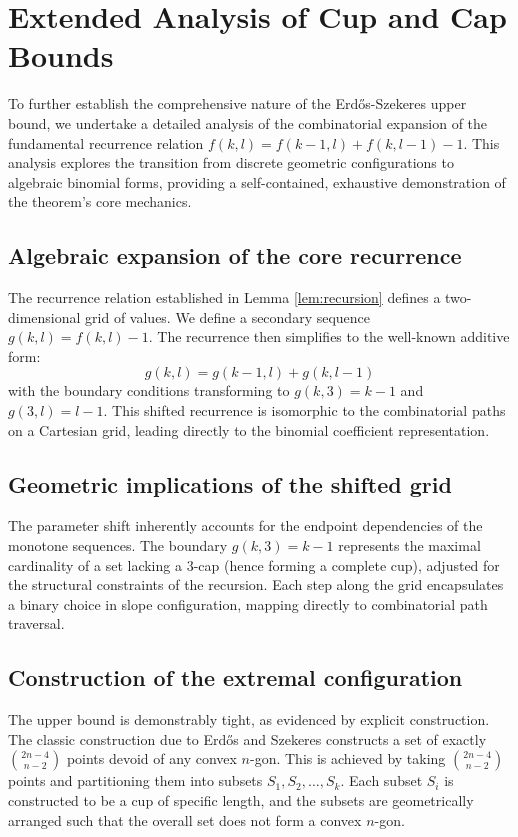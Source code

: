 \documentclass[11pt,a4paper]{article}
\begin{document}
\section{Extended Analysis of Cup and Cap Bounds}

To further establish the comprehensive nature of the Erd\H{o}s-Szekeres upper bound, we undertake a detailed analysis of the combinatorial expansion of the fundamental recurrence relation $f(k,l) = f(k-1,l) + f(k,l-1) - 1$. This analysis explores the transition from discrete geometric configurations to algebraic binomial forms, providing a self-contained, exhaustive demonstration of the theorem's core mechanics.

\subsection{Algebraic expansion of the core recurrence}

The recurrence relation established in Lemma \ref{lem:recursion} defines a two-dimensional grid of values. We define a secondary sequence $g(k,l) = f(k,l) - 1$. The recurrence then simplifies to the well-known additive form:
\begin{equation}
g(k,l) = g(k-1,l) + g(k,l-1)
\end{equation}
with the boundary conditions transforming to $g(k,3) = k-1$ and $g(3,l) = l-1$. This shifted recurrence is isomorphic to the combinatorial paths on a Cartesian grid, leading directly to the binomial coefficient representation.

\subsection{Geometric implications of the shifted grid}
The parameter shift inherently accounts for the endpoint dependencies of the monotone sequences. The boundary $g(k,3) = k-1$ represents the maximal cardinality of a set lacking a $3$-cap (hence forming a complete cup), adjusted for the structural constraints of the recursion. Each step along the grid encapsulates a binary choice in slope configuration, mapping directly to combinatorial path traversal.

\subsection{Construction of the extremal configuration}
The upper bound is demonstrably tight, as evidenced by explicit construction. The classic construction due to Erd\H{o}s and Szekeres constructs a set of exactly $\binom{2n-4}{n-2}$ points devoid of any convex $n$-gon. This is achieved by taking $\binom{2n-4}{n-2}$ points and partitioning them into subsets $S_1, S_2, \dots, S_k$. Each subset $S_i$ is constructed to be a cup of specific length, and the subsets are geometrically arranged such that the overall set does not form a convex $n$-gon.
\end{document}
